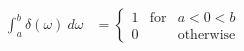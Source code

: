 \documentclass[preview]{standalone}
\begin{document}
\begin{align*}
\int_{a}^{b} \delta(\omega) \ d\omega &=\left\{ \begin{array}{rcl} 1 & \textrm{for} & a<0<b \\ 0 & & \textrm{otherwise} \end{array} \right.
\end{align*}
\end{document}
